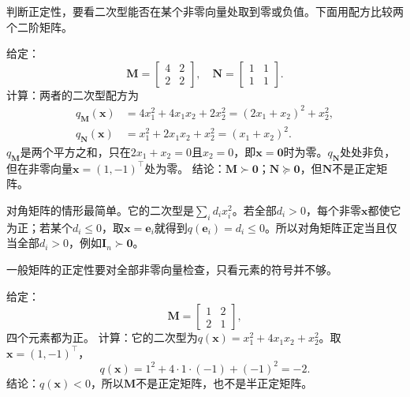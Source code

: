 判断正定性，要看二次型能否在某个非零向量处取到零或负值。下面用配方比较两个二阶矩阵。
\begin{example}[用配方区分正定与半正定]
\label{ex:ls-pd-psd-completing-square}
给定：
\[
 \bm M=\begin{bmatrix}4&2\\2&2\end{bmatrix},\quad
 \bm N=\begin{bmatrix}1&1\\1&1\end{bmatrix}.
\]
计算：两者的二次型配方为
\[
 \begin{aligned}
 q_{\bm M}(\bm x)&=4x_1^2+4x_1x_2+2x_2^2=(2x_1+x_2)^2+x_2^2,\\
 q_{\bm N}(\bm x)&=x_1^2+2x_1x_2+x_2^2=(x_1+x_2)^2.
 \end{aligned}
\]
$q_{\bm M}$是两个平方之和，只在$2x_1+x_2=0$且$x_2=0$，即$\bm x=\bm0$时为零。$q_{\bm N}$处处非负，但在非零向量$\bm x=(1,-1)^\top$处为零。
结论：$\bm M\succ\bm0$；$\bm N\succeq\bm0$，但$\bm N$不是正定矩阵。
\end{example}

对角矩阵的情形最简单。它的二次型是$\sum_id_ix_i^2$。若全部$d_i>0$，每个非零$\bm x$都使它为正；若某个$d_i\leq0$，取$\bm x=\bm e_i$就得到$q(\bm e_i)=d_i\leq0$。所以对角矩阵正定当且仅当全部$d_i>0$，例如$\bm I_n\succ\bm0$。

一般矩阵的正定性要对全部非零向量检查，只看元素的符号并不够。
\begin{example}[反例：元素全为正的对称矩阵未必正定]
\label{ex:ls-positive-entries-not-pd}
给定：
\[
 \bm M=\begin{bmatrix}1&2\\2&1\end{bmatrix},
\]
四个元素都为正。
计算：它的二次型为$q(\bm x)=x_1^2+4x_1x_2+x_2^2$。取$\bm x=(1,-1)^\top$，
\[
 q(\bm x)=1^2+4\cdot1\cdot(-1)+(-1)^2=-2.
\]
结论：$q(\bm x)<0$，所以$\bm M$不是正定矩阵，也不是半正定矩阵。
\end{example}


